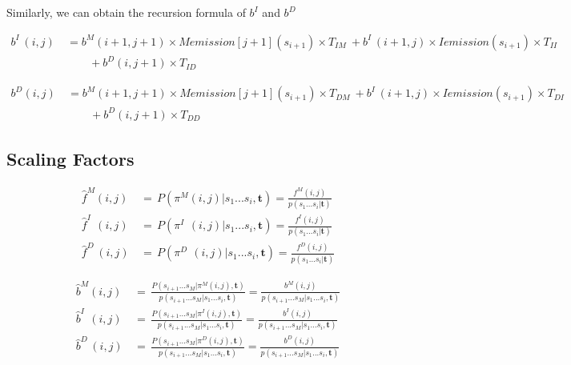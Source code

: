 \documentclass[10pt]{article}
\begin{document}
    Similarly, we can obtain the recursion formula of $b^{I}$ and $b^{D\;}$

    \begin{equation}
    \begin{aligned}
      b^{I\;}(i, j) \
        &= b^M(i+1, j+1) \times Memission[j+1](s_{i+1}) \times T_{IM} \
          + b^{I\;}(i+1, j) \times Iemission(s_{i+1}) \times T_{II} \\
          &\qquad+ b^{D}(i, j+1) \times T_{ID}
    \end{aligned}
    \end{equation}

    \begin{equation}
    \begin{aligned}
      b^{D}(i, j) \
        &= b^M(i+1, j+1) \times Memission[j+1](s_{i+1}) \times T_{DM} \
          + b^{I\;}(i+1, j) \times Iemission(s_{i+1}) \times T_{DI} \\
          &\qquad+ b^{D}(i, j+1) \times T_{DD}
    \end{aligned}
    \end{equation}

  \subsection{Scaling Factors}

    \begin{equation}
    \begin{aligned}
      \widehat{f}^{M}(i, j) \,&=\, P(\pi^M(i, j) | s_1...s_{i}, \mathbf{t}) = \frac{f^{M}(i, j)}{p(s_1...s_{i} | \mathbf{t})} \\
      \widehat{f}^{I\;\;}(i, j) \,&=\, P(\pi^{I\;\;}(i, j) | s_1...s_{i}, \mathbf{t}) = \frac{f^{I}(i, j)}{p(s_1...s_{i} | \mathbf{t})}\\
      \widehat{f}^{D\;}(i, j) \,&=\, P(\pi^{D\;}\,(i, j) | s_1...s_{i}, \mathbf{t}) = \frac{f^{D}(i, j)}{p(s_1...s_{i} | \mathbf{t})}
    \end{aligned}
    \end{equation}

    \begin{equation}
    \begin{aligned}
      \widehat{b}^{M}(i, j) \,&=\, \frac{P(s_{i+1}...s_M | \pi^M(i, j), \mathbf{t})}{p(s_{i+1}...s_M | s_1...s_{i}, \mathbf{t})} = \frac{b^{M}(i, j)}{p(s_{i+1}...s_M | s_1...s_{i}, \mathbf{t})} \\
      \widehat{b}^{I\;\;}(i, j) \,&=\, \frac{P(s_{i+1}...s_M | \pi^{I}(i, j), \mathbf{t})}{p(s_{i+1}...s_M | s_1...s_{i}, \mathbf{t})} = \frac{b^{I}(i, j)}{p(s_{i+1}...s_M | s_1...s_{i}, \mathbf{t})} \\
      \widehat{b}^{D\;}(i, j) \,&=\, \frac{P(s_{i+1}...s_M | \pi^{D}(i, j), \mathbf{t})}{p(s_{i+1}...s_M | s_1...s_{i}, \mathbf{t})} = \frac{b^{D}(i, j)}{p(s_{i+1}...s_M | s_1...s_{i}, \mathbf{t})}
    \end{aligned}
    \end{equation}
\end{document}
